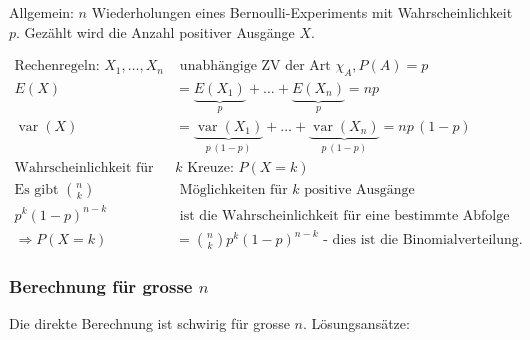 \documentclass[10pt,a4paper]{scrartcl}
\newif\ifincludeDerivations
\DeclareMathOperator{\var}{var}
\begin{document}
Allgemein: $n$ Wiederholungen eines Bernoulli-Experiments mit Wahrscheinlichkeit $p$. Gezählt wird die Anzahl positiver Ausgänge $X$.

\begin{align*}
\text{Rechenregeln: } X_1, \dots, X_n  &\text{ unabhängige ZV der Art } \chi_A, P(A)= p \\
E(X) & = \underbrace{E(X_1)}_{p} + \dots + \underbrace{E(X_n)}_{p} = np \\
\var(X) & = \underbrace{\var(X_1)}_{p\,(1-p)} + \dots + \underbrace{\var(X_n)}_{p\,(1-p)} = np\,(1-p) \\
\text{Wahrscheinlichkeit für } &k \text{ Kreuze: } P(X = k) \\
\text{Es gibt } \binom{n}{k} &\text{ Möglichkeiten für } k \text{ positive Ausgänge} \\ 
p^k(1-p)^{n-k} &\text{ ist die Wahrscheinlichkeit für eine bestimmte Abfolge von Ausgängen} \\
\Rightarrow P(X=k) &= \binom{n}{k} p^k(1-p)^{n-k} \text{ - dies ist die Binomialverteilung.}
\end{align*}

\ifincludeDerivations
\paragraph{Berechnung des Erwartungswertes aus $P(X=k)$} 

\begin{align*}
E(X) &= \sum_{k=0}^{n} k \binom{n}{k} p^k(1-p)^{n-k} \\
     &= \sum_{k=1}^{n} \binom{n}{k} k p^{k-1}p (1-p)^{n-k} & x = p, y = p-1 \\
     &= \sum_{k=1}^{n} p \binom{n}{k} \underbrace{k x^{k-1}}_{\frac{d}{dx} x^k} y^{n-k} \\
     & = p \frac{d}{dx} \sum_{k=0}^{n} \binom{n}{k}x^k y^{n-k} \\
     & = p \frac{d}{dx} (x+y)^n \\
     & = p n (x+y)^{n-1} = pn(p + 1-p)^{n-1} \\
     & = np
\end{align*}
\fi

\subsubsection{Berechnung für grosse $n$}
Die direkte Berechnung ist schwirig für grosse $n$. Lösungsansätze:
\end{document}
